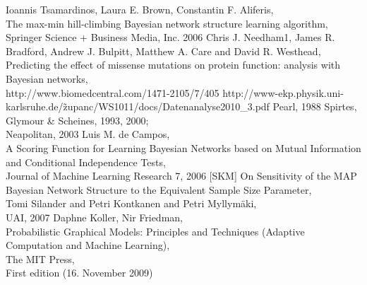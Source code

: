 \begin{thebibliography}{56}

Ioannis Tsamardinos, Laura E. Brown, Constantin F. Aliferis,\\
The max-min hill-climbing Bayesian network structure learning algorithm,\\
Springer Science + Business Media,
Inc. 2006
Chris J. Needham1, James R. Bradford, Andrew J. Bulpitt, Matthew A. Care and David R. Westhead,\\
Predicting the effect of missense mutations on protein function: analysis with Bayesian networks,\\
http://www.biomedcentral.com/1471-2105/7/405
http://www-ekp.physik.uni-karlsruhe.de/\~zupanc/WS1011/docs/Datenanalyse2010\_3.pdf
Pearl,
1988
Spirtes, Glymour \& Scheines,
1993, 2000; \\
Neapolitan,
2003
Luis M. de Campos,\\
A Scoring Function for Learning Bayesian Networks based on Mutual
Information and Conditional Independence Tests,\\
Journal of Machine Learning Research 7, 2006
[SKM]
On Sensitivity of the MAP Bayesian Network Structure to the Equivalent Sample Size Parameter,\\
Tomi Silander and Petri Kontkanen and Petri Myllymäki,\\
UAI, 2007
Daphne Koller, Nir Friedman,\\
Probabilistic Graphical Models: Principles and Techniques (Adaptive Computation and Machine Learning),\\
The MIT Press,\\
First edition (16. November 2009)

\end{thebibliography}




			
			
			
			
			
			
			
			
			
			
			
			
			
			
			
			
			



			
			
			
			